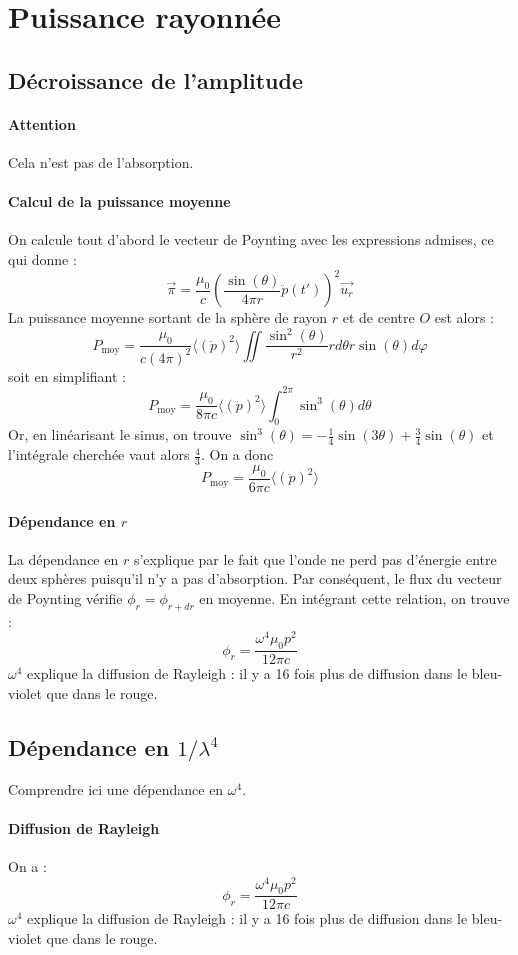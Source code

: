 \documentclass[french]{book}
\theoremstyle{plain}
\theoremstyle{definition}
\theoremstyle{remark}
\begin{document}
\section{Puissance rayonnée}
\subsection{Décroissance de l'amplitude}
\paragraph{Attention} Cela n'est pas de l'absorption.
\paragraph{Calcul de la puissance moyenne} On calcule tout d'abord le vecteur de Poynting avec les expressions admises, ce qui donne : $$\overrightarrow{\pi}=\frac{\mu_0}{c}\left(\frac{\sin(\theta)}{4\pi r}\ddot{p}(t')\right)^2\overrightarrow{u_r}$$ La puissance moyenne sortant de la sphère de rayon $r$ et de centre $O$ est alors : $$P_\text{moy}=\frac{\mu_0}{c(4\pi)^2}\langle(\ddot{p})^2\rangle\iint\frac{\sin^2(\theta)}{r^2}rd\theta r\sin(\theta)d\varphi$$ soit en simplifiant : $$P_\text{moy}=\frac{\mu_0}{8\pi c}\langle(\ddot{p})^2\rangle\int_{0}^{2\pi}\sin^3(\theta)d\theta$$
Or, en linéarisant le sinus, on trouve $\sin^3(\theta)=-\frac{1}{4}\sin(3\theta)+\frac{3}{4}\sin(\theta)$ et l'intégrale cherchée vaut alors $\frac{4}{3}$. On a donc $$P_\text{moy}=\frac{\mu_0}{6\pi c}\langle(\ddot{p})^2\rangle$$
\paragraph{Dépendance en $r$} La dépendance en $r$ s'explique par le fait que l'onde ne perd pas d'énergie entre deux sphères puisqu'il n'y a pas d'absorption. Par conséquent, le flux du vecteur de Poynting vérifie $\phi_r=\phi_{r+dr}$ en moyenne. En intégrant cette relation, on trouve : $$\phi_r=\frac{\omega^4\mu_0 p^2}{12\pi c}$$ $\omega^4$ explique la diffusion de Rayleigh : il y a 16 fois plus de diffusion dans le bleu-violet que dans le rouge.
\subsection{Dépendance en $1/\lambda^4$}
Comprendre ici une dépendance en $\omega^4$.
\paragraph{Diffusion de Rayleigh}
On a : $$\phi_r=\frac{\omega^4\mu_0 p^2}{12\pi c}$$ $\omega^4$ explique la diffusion de Rayleigh : il y a 16 fois plus de diffusion dans le bleu-violet que dans le rouge.
\end{document}
